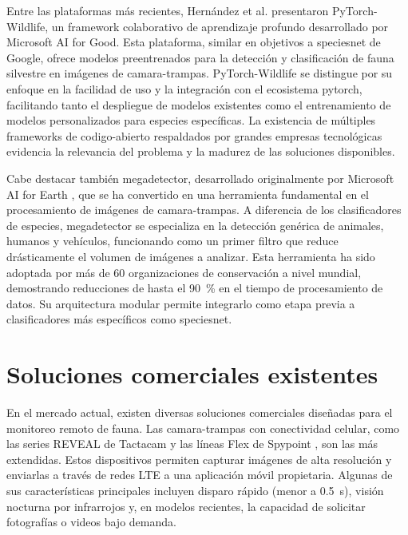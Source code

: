 \documentclass[a4paper, 12pt]{report}
\begin{document}
Entre las plataformas más recientes, Hernández et al. \cite{hernandez2024pytorchwildlife}
presentaron PyTorch-Wildlife, un framework colaborativo de aprendizaje profundo
desarrollado por Microsoft AI for Good. Esta plataforma, similar en objetivos
a \gls{speciesnet} de Google, ofrece modelos preentrenados para la detección
y clasificación de fauna silvestre en imágenes de \glspl{camara-trampa}.
PyTorch-Wildlife se distingue por su enfoque en la facilidad de uso y la
integración con el ecosistema \gls{pytorch}, facilitando tanto el despliegue de
modelos existentes como el entrenamiento de modelos personalizados para
especies específicas. La existencia de múltiples frameworks de \gls{codigo-abierto}
respaldados por grandes empresas tecnológicas evidencia la relevancia del
problema y la madurez de las soluciones disponibles.

Cabe destacar también \gls{megadetector}, desarrollado originalmente por Microsoft
AI for Earth \cite{beery2019megadetector}, que se ha convertido en una
herramienta fundamental en el procesamiento de imágenes de \glspl{camara-trampa}.
A diferencia de los clasificadores de especies, \gls{megadetector} se especializa
en la detección genérica de animales, humanos y vehículos, funcionando como
un primer filtro que reduce drásticamente el volumen de imágenes a analizar.
Esta herramienta ha sido adoptada por más de 60 organizaciones de conservación
a nivel mundial, demostrando reducciones de hasta el \qty{90}{\percent} en el tiempo de
procesamiento de datos. Su arquitectura modular permite integrarlo como
etapa previa a clasificadores más específicos como \gls{speciesnet}.

\section{Soluciones comerciales existentes}

En el mercado actual, existen diversas soluciones comerciales diseñadas para
el monitoreo remoto de fauna. Las \glspl{camara-trampa} con conectividad
celular, como las series REVEAL de Tactacam \cite{tactacam2024reveal} y las
líneas Flex de Spypoint \cite{spypoint2024cellular}, son las más extendidas.
Estos dispositivos permiten capturar imágenes de alta resolución y enviarlas
a través de redes LTE a una aplicación móvil propietaria. Algunas de sus
características principales incluyen disparo rápido (menor a \qty{0.5}{s}),
visión nocturna por infrarrojos y, en modelos recientes, la capacidad de
solicitar fotografías o videos bajo demanda.
\end{document}
